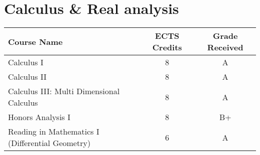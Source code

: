 \documentclass[11pt]{article}
\begin{document}
\section*{Calculus \& Real analysis}

\begin{center}
\begin{tabular}{lcc}
Course Name & ECTS Credits & Grade Received \\ \toprule
Calculus I & 8 & A \\
Calculus II & 8 & A \\
Calculus III: Multi Dimensional Calculus & 8 & A \\
Honors Analysis I & 8 & B+ \\
Reading in Mathematics I (Differential Geometry) & 6 & A
\end{tabular}
\end{center}
\end{document}

